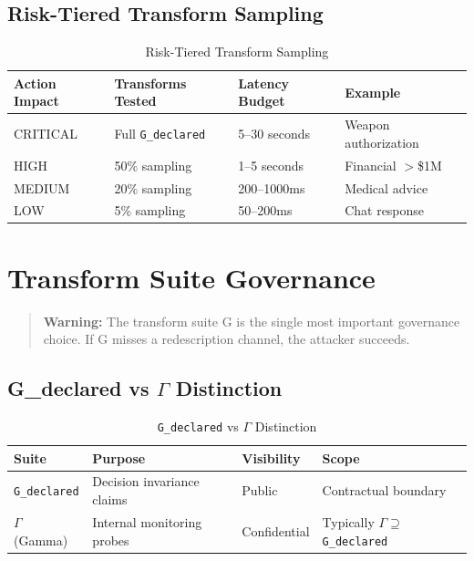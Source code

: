 \documentclass[11pt,letterpaper]{article}
\theoremstyle{definition}
\theoremstyle{remark}
\begin{document}
\subsection{Risk-Tiered Transform Sampling}

\begin{table}[h]
\centering
\begin{tabular}{@{}llll@{}}
\toprule
\textbf{Action Impact} & \textbf{Transforms Tested} & \textbf{Latency Budget} & \textbf{Example} \\
\midrule
CRITICAL & Full \texttt{G\_declared} & 5--30 seconds & Weapon authorization \\
HIGH & 50\% sampling & 1--5 seconds & Financial $>$\$1M \\
MEDIUM & 20\% sampling & 200--1000ms & Medical advice \\
LOW & 5\% sampling & 50--200ms & Chat response \\
\bottomrule
\end{tabular}
\caption{Risk-Tiered Transform Sampling}
\end{table}


\section{Transform Suite Governance}

\begin{quote}
\textbf{Warning:} The transform suite G is the single most important governance choice. If G misses a redescription channel, the attacker succeeds.
\end{quote}

\subsection{G\_declared vs $\Gamma$ Distinction}

\begin{table}[h]
\centering
\begin{tabular}{@{}llll@{}}
\toprule
\textbf{Suite} & \textbf{Purpose} & \textbf{Visibility} & \textbf{Scope} \\
\midrule
\texttt{G\_declared} & Decision invariance claims & Public & Contractual boundary \\
$\Gamma$ (Gamma) & Internal monitoring probes & Confidential & Typically $\Gamma \supseteq$ \texttt{G\_declared} \\
\bottomrule
\end{tabular}
\caption{\texttt{G\_declared} vs $\Gamma$ Distinction}
\end{table}
\end{document}
